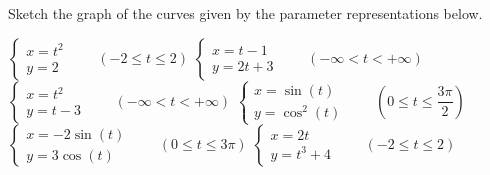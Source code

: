 \ifcalculus\pagebreak\fi
\begin{Exercise}[label = oef_parameterkrommes_tekenen2] Sketch the graph of the curves given by the parameter representations below. 
	\begin{multicols}{2}
		\Question[difficulty = 1] $\left\{\begin{array}{l} x = t^2 \\ y = 2 \end{array}\right. \qquad (-2  \leq t \leq 2) $
		\Question[difficulty = 1] $\left\{\begin{array}{l} x = t-1 \\ y = 2t+3 \end{array}\right. \qquad (- \infty < t < + \infty) $
		\Question[difficulty = 1] $\left\{\begin{array}{l} x = t^2 \\ y = t-3 \end{array}\right. \qquad (- \infty < t < + \infty) $
		\ifanalysis\Question[difficulty = 1]\fi\ifcalculus\Question[difficulty = 2]\fi $\left\{\begin{array}{l} x = \sin (t) \\ y = \cos^2 (t) \end{array}\right. \qquad \left(0 \leq t \leq \dfrac{3\pi}{2} \right) $
		\Question[difficulty = 2] $\left\{\begin{array}{l} x = -2\sin (t) \\ y = 3\cos (t) \end{array}\right. \qquad \left(0 \leq t \leq 3\pi \right) $
		\Question[difficulty = 1] $\left\{\begin{array}{l} x = 2t \\ y = t^3+4 \end{array}\right. \qquad (-2  \leq t \leq 2) $
	    \EndCurrentQuestion
	\end{multicols}

\end{Exercise}


